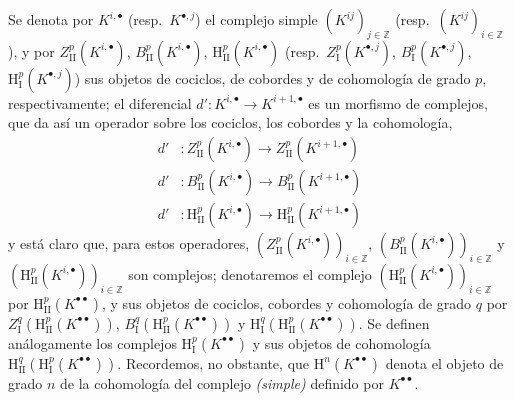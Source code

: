 \begin{env}[11.3.1]
Se denota por $K^{i,\bullet}$ (resp.~$K^{\bullet,j}$) el complejo simple $(K^{ij})_{j\in\mathbb Z}$ (resp.~$(K^{ij})_{i\in\mathbb Z}$), y por $Z_{\mathrm{II}}^p(K^{i,\bullet})$, $B_{\mathrm{II}}^p(K^{i,\bullet})$, $\mathrm H_{\mathrm{II}}^p(K^{i,\bullet})$ (resp.~$Z_{\mathrm I}^p(K^{\bullet,j})$, $B_{\mathrm I}^p(K^{\bullet,j})$, $\mathrm H_{\mathrm I}^p(K^{\bullet,j})$) sus objetos de cociclos, de cobordes y de cohomología de grado $p$, respectivamente;
el diferencial $d':K^{i,\bullet}\to K^{i+1,\bullet}$ es un morfismo de complejos, que da así un operador sobre los cociclos, los cobordes y la cohomología,
\[
\begin{aligned}
  d'&:Z_{\mathrm{II}}^p(K^{i,\bullet})
      \longrightarrow Z_{\mathrm{II}}^p(K^{i+1,\bullet})\\
  d'&:B_{\mathrm{II}}^p(K^{i,\bullet})
      \longrightarrow B_{\mathrm{II}}^p(K^{i+1,\bullet})\\
  d'&:\mathrm H_{\mathrm{II}}^p(K^{i,\bullet})
      \longrightarrow \mathrm H_{\mathrm{II}}^p(K^{i+1,\bullet})
\end{aligned}
\]
y está claro que, para estos operadores, $(Z_{\mathrm{II}}^p(K^{i,\bullet}))_{i\in\mathbb Z}$, $(B_{\mathrm{II}}^p(K^{i,\bullet}))_{i\in\mathbb Z}$ y $(\mathrm H_{\mathrm{II}}^p(K^{i,\bullet}))_{i\in\mathbb Z}$ son complejos;
denotaremos el complejo $(\mathrm H_{\mathrm{II}}^p(K^{i,\bullet}))_{i\in\mathbb Z}$ por $\mathrm H_{\mathrm{II}}^p(K^{\bullet\bullet})$, y sus objetos de cociclos, cobordes y cohomología de grado $q$ por $Z_{\mathrm I}^q(\mathrm H_{\mathrm{II}}^p(K^{\bullet\bullet}))$, $B_{\mathrm I}^q(\mathrm H_{\mathrm{II}}^p(K^{\bullet\bullet}))$ y $\mathrm H_{\mathrm I}^q(\mathrm H_{\mathrm{II}}^p(K^{\bullet\bullet}))$.
Se definen análogamente los complejos $\mathrm H_{\mathrm I}^p(K^{\bullet\bullet})$ y sus objetos de cohomología $\mathrm H_{\mathrm{II}}^q(\mathrm H_{\mathrm I}^p(K^{\bullet\bullet}))$.
Recordemos, no obstante, que $\mathrm H^n(K^{\bullet\bullet})$ denota el objeto de grado $n$ de la cohomología del complejo \emph{(simple)} definido por $K^{\bullet\bullet}$.
\end{env}

